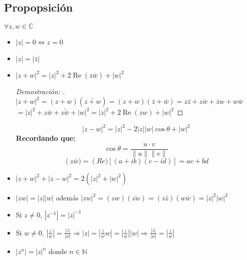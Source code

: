 \subsection{Propopsición}
$\forall z,w \in \mathbb{C}$
\begin{itemize}
  \item $|z|=0 \Leftrightarrow z=0$
  \item $|z|=|\bar{z}|$
  \item $|z+w|^2 = |z|^2 +2\operatorname{Re}(z\bar{w})+|w|^2$
        \begin{proof}[Demostración: ]
          $|z+w|^2 = (z+w)(\bar{z+w}) = (z+w)(\bar{z}+\bar{w})=z\bar{z}+z\bar{w}+\bar{z}w+w\bar{w}$
          $=|z|^2+z\bar{w}+ \bar{z\bar{w}}+|w|^2 = |z|^2 + 2\operatorname{Re}(zw)+|w|^2$
        \end{proof}
        \begin{definition}
          \[
            |z-w|^2 = |z|^2 - 2|z||w|\cos{\theta} + |w|^2 
          \]
          \textbf{Recordando que: }
          \[
            \cos{\theta} = \displaystyle\frac{u \cdot v}{\|u\| \|v\|}  
          \]
          \[
            \operatorname(z\bar{w})= \operatorname(Re)[(a+ib)(c-id)]=ac+bd
          \]
        \end{definition}
  \item \begin{definition}
         $|z+w|^2 + |z-w|^2 = 2(|z|^2 + |w|^2)$
        \end{definition}
  \item $|zw| = |z||w|$ además $|zw|^2 = (zw)(\bar{zw}) = (z\bar{z})(w\bar{w}) = |z|^2 |w|^2$
  \item Si $z \neq 0$, $|z^{-1}| = |z|^{-1}$
  \item Si $w \neq 0$, $|\displaystyle\frac{z}{w}|=\displaystyle\frac{|z|}{|w|} \Rightarrow |z| = |\frac{z}{w} w| = |\frac{z}{w}||w| \Rightarrow \frac{|z|}{|w|} = |\frac{z}{w}|$
  \item $|z^n| = |z|^n$ donde $n \in \mathbb{N}$
\end{itemize}

